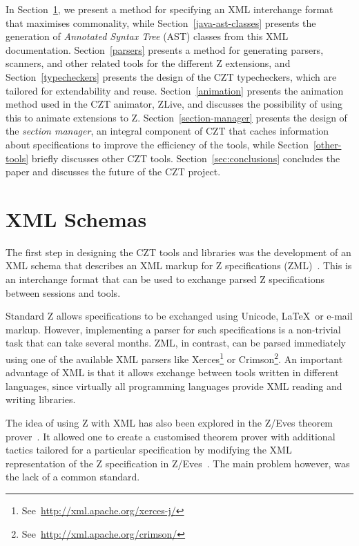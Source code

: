 \documentclass{llncs}
\begin{document}
  In Section~\ref{xml-schemas}, we present a method for specifying an
  XML interchange format that maximises commonality, while
  Section~\ref{java-ast-classes} presents the generation of
  \emph{Annotated Syntax Tree} (AST) classes from this XML
  documentation. Section~\ref{parsers} presents a method for
  generating parsers, scanners, and other related tools for the
  different Z extensions, and Section~\ref{typecheckers} presents
  the design of the CZT typecheckers, which are tailored for
  extendability and reuse. Section~\ref{animation} presents the
  animation method used in the CZT animator, ZLive, and discusses the
  possibility of using this to animate extensions to
  Z. Section~\ref{section-manager} presents the design of the {\em
  section manager}, an integral component of CZT that caches
  information about specifications to improve the efficiency of the
  tools, while Section~\ref{other-tools} briefly discusses other CZT
  tools. Section~\ref{sec:conclusions} concludes the paper and
  discusses the future of the CZT project.


\section{XML Schemas}
\label{xml-schemas}

  The first step in designing the CZT tools and libraries was the
  development of an XML schema that describes an XML markup for Z
  specifications (ZML)~\cite{UttEA:03}.  This is an interchange format
  that can be used to exchange parsed Z specifications between 
  sessions and tools.  

  Standard Z allows specifications to be exchanged using Unicode,
  \LaTeX\ or e-mail markup.  However, implementing a parser for such
  specifications is a non-trivial task that can take several months.
  ZML, in contrast, can be parsed
  immediately using one of the available XML parsers like
  Xerces\footnote{See~\url{http://xml.apache.org/xerces-j/}} or
  Crimson\footnote{See~\url{http://xml.apache.org/crimson/}}.
  An important advantage of XML is that it allows
  exchange between tools written in different languages, since virtually
  all programming languages provide XML reading and writing libraries.

  The idea of using Z with XML has also been explored in the
  Z/Eves theorem prover~\cite{tp.tools:zeves.ref}.  It allowed one to
  create a customised theorem prover with additional tactics tailored
  for a particular specification by modifying the XML representation
  of the Z specification in Z/Eves~\cite{tp.tools:zeves.api}.
  The main problem however, was the lack of a common standard.
\end{document}
